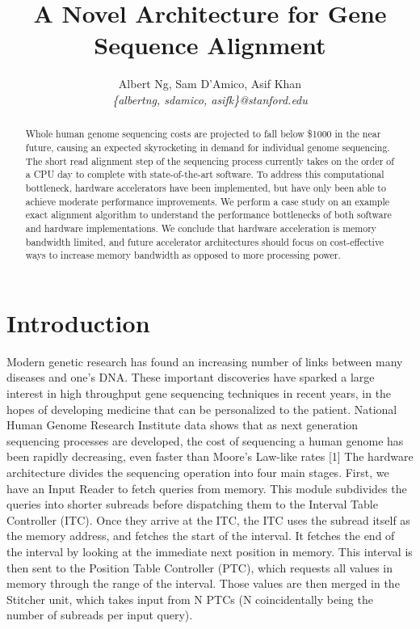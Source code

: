 \documentclass[11pt]{article}
\title{A Novel Architecture for Gene Sequence Alignment}
\author{Albert Ng, Sam D'Amico, Asif Khan\\ \emph{\{albertng, sdamico, asifk\}@stanford.edu}}
\date{}
\begin{document}
\maketitle

\begin{abstract}

%

Whole human genome sequencing costs are projected to fall below \$1000 in the near future, causing an expected skyrocketing in demand for individual genome sequencing.  The short read alignment step of the sequencing process currently takes on the order of a CPU day to complete with state-of-the-art software.  To address this computational bottleneck, hardware accelerators have been implemented, but have only been able to achieve moderate performance improvements.  We perform a case study on an example exact alignment algorithm to understand the performance bottlenecks of both software and hardware implementations.  We conclude that hardware acceleration is memory bandwidth limited, and future accelerator architectures should focus on cost-effective ways to increase memory bandwidth as opposed to more processing power. 

\end{abstract}

%
%

\section{Introduction}
\par
Modern genetic research has found an increasing number of links between many diseases and one’s DNA.  These important discoveries have sparked a large interest in high throughput gene sequencing techniques in recent years, in the hopes of developing medicine that can be personalized to the patient.  National Human Genome Research Institute data shows that as next generation sequencing processes are developed, the cost of sequencing a human genome has been rapidly decreasing, even faster than Moore’s Law-like rates [1]\cite{frigo:pldi98:cilk5}	The hardware architecture divides the sequencing operation into four main stages.  First, we have an Input Reader to fetch queries from memory.  This module subdivides the queries into shorter subreads before dispatching them to the Interval Table Controller (ITC).  Once they arrive at the ITC, the ITC uses the subread itself as the memory address, and fetches the start of the interval.  It fetches the end of the interval by looking at the immediate next position in memory.  This interval is then sent to the Position Table Controller (PTC), which requests all values in memory through the range of the interval.  Those values are then merged in the Stitcher unit, which takes input from N PTCs (N coincidentally being the number of subreads per input query).
\end{document}
